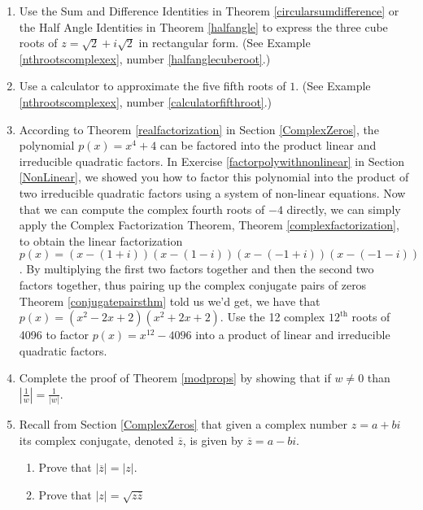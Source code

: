 \begin{enumerate}

\setcounter{enumi}{\value{HW}}

\item Use the Sum and Difference Identities in Theorem \ref{circularsumdifference} or the Half Angle Identities in Theorem \ref{halfangle} to express the three cube roots of $z=\sqrt{2} + i\sqrt{2}$ in rectangular form. (See Example \ref{nthrootscomplexex}, number \ref{halfanglecuberoot}.)

\item Use a calculator to approximate the five fifth roots of $1$.  (See Example \ref{nthrootscomplexex}, number \ref{calculatorfifthroot}.)

\item According to Theorem \ref{realfactorization} in Section \ref{ComplexZeros}, the polynomial $p(x) = x^{4} + 4$ can be factored into the product linear and irreducible quadratic factors.  In Exercise \ref{factorpolywithnonlinear} in Section \ref{NonLinear}, we showed you how to factor this polynomial into the product of two irreducible quadratic factors using a system of non-linear equations.  Now that we can compute the complex fourth roots of $-4$ directly, we can simply apply the Complex Factorization Theorem, Theorem \ref{complexfactorization}, to obtain the linear factorization $p(x) = (x - (1 + i))(x - (1 - i))(x - (-1 + i))(x - (-1 - i))$.  By multiplying the first two factors together and then the second two factors together, thus pairing up the complex conjugate pairs of zeros Theorem \ref{conjugatepairsthm} told us we'd get, we have that $p(x) = (x^{2} - 2x + 2)(x^{2} + 2x + 2)$.  Use the 12 complex $12^{\text{th}}$ roots of 4096 to factor $p(x) = x^{12} - 4096$ into a product of linear and irreducible quadratic factors.

\item Complete the proof of Theorem \ref{modprops} by showing that if $w \neq 0$ than  $\left| \frac{1}{w}\right| = \frac{1}{|w|}$.

\item Recall from Section \ref{ComplexZeros} that given a complex number $z = a+bi$ its complex conjugate, denoted $\overline{z}$, is given by $\overline{z} = a - bi$.

\begin{enumerate}

\item Prove that $\left| \overline{z} \right| = |z|$.

\item Prove that $|z| = \sqrt{z \overline{z}}$


\end{enumerate}
\end{enumerate}
